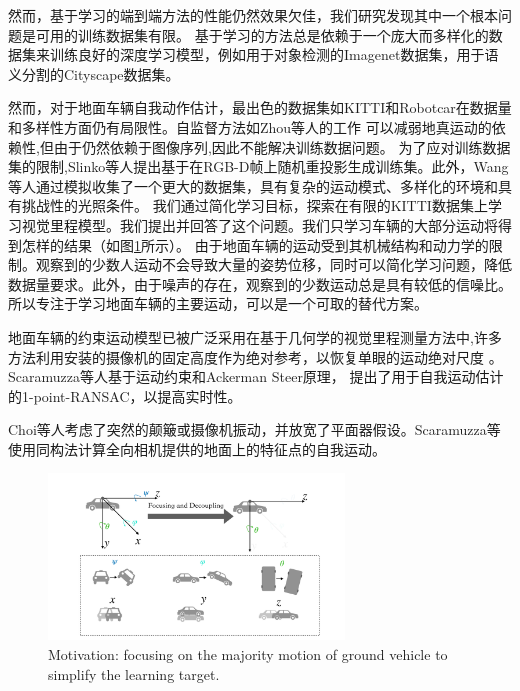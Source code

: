 然而，基于学习的端到端方法的性能仍然效果欠佳，我们研究发现其中一个根本问题是可用的训练数据集有限。
基于学习的方法总是依赖于一个庞大而多样化的数据集来训练良好的深度学习模型，例如用于对象检测的Imagenet数据集\cite{deng2009imagenet}，用于语义分割的Cityscape\cite{Cordts2016Cityscapes}数据集。

然而，对于地面车辆自我动作估计，最出色的数据集如KITTI\cite{geiger2012kitti}和Robotcar\cite{RobotCarDatasetIRJR}在数据量和多样性方面仍有局限性。自监督方法如Zhou等人的工作
\cite{zhou2017unsupervised}可以减弱地真运动的依赖性,但由于仍然依赖于图像序列,因此不能解决训练数据问题。
为了应对训练数据集的限制,Slinko等人\cite{slinko2019training}提出基于在RGB-D帧上随机重投影生成训练集。此外，Wang等人\cite{wang2020tartanair}通过模拟收集了一个更大的数据集，具有复杂的运动模式、多样化的环境和具有挑战性的光照条件。
我们通过简化学习目标，探索在有限的KITTI数据集上学习视觉里程模型。我们提出并回答了这个问题。我们只学习车辆的大部分运动将得到怎样的结果（如图\ref{fig:car_simplify}所示）。
由于地面车辆的运动受到其机械结构和动力学的限制。观察到的少数人运动不会导致大量的姿势位移，同时可以简化学习问题，降低数据量要求。此外，由于噪声的存在，观察到的少数运动总是具有较低的信噪比。
所以专注于学习地面车辆的主要运动，可以是一个可取的替代方案。

地面车辆的约束运动模型已被广泛采用在基于几何学的视觉里程测量方法中,许多方法利用安装的摄像机的固定高度作为绝对参考，以恢复单眼的运动绝对尺度
\cite{Song2015MoncularScale,Lee2015MoncularScale,zhou2016reliable,wang2018monocular,7898840}。Scaramuzza等人基于运动约束和Ackerman Steer原理，
提出了用于自我运动估计的1-point-RANSAC，以提高实时性。

Choi等人\cite{choi2015simplified}考虑了突然的颠簸或摄像机振动，并放宽了平面器假设。Scaramuzza等\cite{4625958}使用同构法计算全向相机提供的地面上的特征点的自我运动。

\begin{figure}[h]\centering
    \includegraphics[width=0.7\textwidth]{datavo/car_simplify.pdf}
    \caption{Motivation: focusing on the majority motion of ground vehicle to simplify the learning target.}
    \label{fig:car_simplify}
\end{figure}

